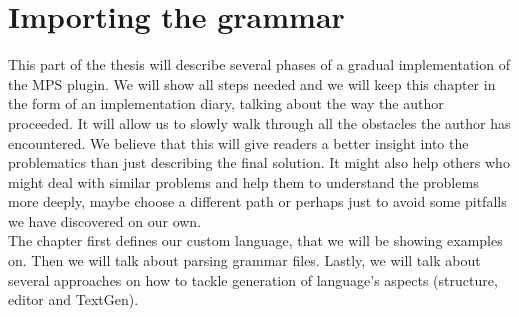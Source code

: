 \chapter{Importing the grammar}
\label{chap:importing_the_grammar}

This part of the thesis will describe several phases of a gradual implementation of the MPS plugin.
We will show all steps needed and we will keep this chapter in the form of an implementation diary, talking about the way the author proceeded.
It will allow us to slowly walk through all the obstacles the author has encountered.
We believe that this will give readers a better insight into the problematics than just describing the final solution.
It might also help others who might deal with similar problems and help them to understand the problems more deeply, maybe choose a different path or perhaps just to avoid some pitfalls we have discovered on our own.
\\

The chapter first defines our custom language, that we will be showing examples on.
Then we will talk about parsing grammar files.
Lastly, we will talk about several approaches on how to tackle generation of language's aspects (structure, editor and TextGen).



\pagebreak



\pagebreak



\pagebreak

%


%


%